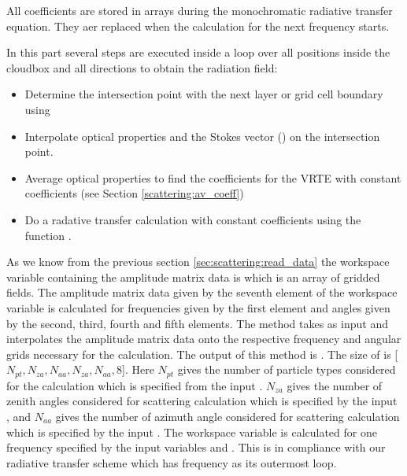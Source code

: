 All coefficients are stored in arrays during the monochromatic
radiative transfer equation. They aer replaced when the calculation
for the next frequency starts.


In this part several steps are executed inside a loop over all
positions inside the cloudbox and all directions to obtain the
radiation field:
\begin{itemize}
\item Determine the intersection point with the next layer or grid
  cell boundary using 
\item Interpolate optical properties and the Stokes vector
  () on the intersection point.
\item Average optical properties to find the coefficients for the VRTE
  with constant coefficients (see Section \ref{scattering:av_coeff})
\item Do a radative transfer calculation with constant coefficients
  using the function .
\end{itemize}




\label{sec:scattering:single_scat_prop}

\label{sec:scattering:gen_ampmat}

As we know from the previous section \ref{sec:scattering:read_data}
the workspace variable containing the amplitude matrix data is
 which is an array of gridded fields. The
amplitude matrix data given by the seventh element of the workspace
variable  is calculated for frequencies given
by the first element and angles given by the second, third, fourth and
fifth elements.  The method  takes
 as input and interpolates the amplitude
matrix data onto the respective frequency and angular grids necessary
for the calculation.  The output of this method is
.  The size of  is [$N_{pt},
N_{za}, N_{aa}, N_{za}, N_{aa}, 8$]. Here $N_{pt}$ gives the number of
particle types considered for the calculation which is specified from
the input . $N_{za}$ gives the number of
zenith angles considered for scattering calculation which is specified
by the input , and $N_{aa}$ gives the number
of azimuth angle considered for scattering calculation which is
specified by the input .  The workspace
variable  is calculated for one frequency
specified by the input variables  and
. This is in compliance with our radiative
transfer scheme which has frequency as its outermost loop.

